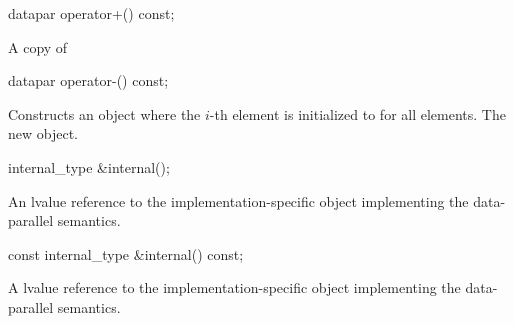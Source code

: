 \begin{wgText}
  \begin{itemdecl}
datapar operator+() const;
  \end{itemdecl}
  \begin{itemdescr}
    \pnum \returns A copy of 
  \end{itemdescr}

  \begin{itemdecl}
datapar operator-() const;
  \end{itemdecl}
  \begin{itemdescr}
    \pnum\effects Constructs an object where the $i$-th element is initialized to  for all elements.
    \pnum\returns The new object.
  \end{itemdescr}

  \begin{itemdecl}
internal_type &internal();
  \end{itemdecl}
  \begin{itemdescr}
    \pnum\returns An lvalue reference to the implementation-specific object implementing the data-parallel semantics.
  \end{itemdescr}

  \begin{itemdecl}
const internal_type &internal() const;
  \end{itemdecl}
  \begin{itemdescr}
    \pnum\returns A \const lvalue reference to the implementation-specific object implementing the data-parallel semantics.
  \end{itemdescr}

  

\end{wgText}
